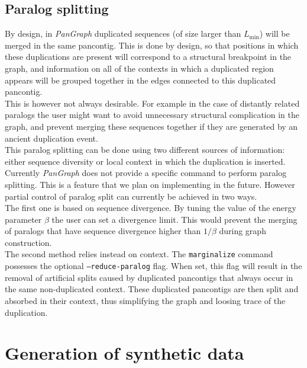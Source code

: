 \documentclass[aps,rmp,reprint,superscriptaddress,notitlepage,10pt,onecolumn]{revtex4-1}
\newcommand{\Lthr}{L_{\min}}
\begin{document}

\subsection{Paralog splitting}

By design, in \textit{PanGraph} duplicated sequences (of size larger than $\Lthr$) will be merged in the same pancontig. This is done by design, so that positions in which these duplications are present will correspond to a structural breakpoint in the graph, and information on all of the contexts in which a duplicated region appears will be grouped together in the edges connected to this duplicated pancontig.\\
This is however not always desirable. For example in the case of distantly related paralogs the user might want to avoid unnecessary structural complication in the graph, and prevent merging these sequences together if they are generated by an ancient duplication event.\\

This paralog splitting can be done using two different sources of information: either sequence diversity or local context in which the duplication is inserted. Currently \textit{PanGraph} does not provide a specific command to perform paralog splitting. This is a feature that we plan on implementing in the future. However partial control of paralog split can currently be achieved in two ways.\\
The first one is based on sequence divergence. By tuning the value of the energy parameter $\beta$ the user can set a divergence limit. This would prevent the merging of paralogs that have sequence divergence higher than $1/\beta$ during graph construction.\\
The second method relies instead on context. The \texttt{marginalize} command possesses the optional \texttt{--reduce-paralog} flag. When set, this flag will result in the removal of artificial splits caused by duplicated pancontigs that always occur in the same non-duplicated context. These duplicated pancontigs are then split and absorbed in their context, thus simplifying the graph and loosing trace of the duplication.\\

\section{Generation of synthetic data}
\label{sec:data_generation}
\end{document}
